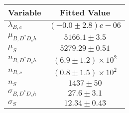 \begin{tabular}[t]{lc}
\hline
Variable &Fitted Value\\
\hline\hline
$\lambda_{B,c}$&$(-0.0\pm2.8)e-06$\\
\hline
$\mu_{B, D^* D_s h}$&$5166.1\pm3.5$\\
\hline
$\mu_S$&$5279.29\pm0.51$\\
\hline
$n_{B, D^* D_s h}$&$(6.9\pm1.2)\times 10^2$\\
\hline
$n_{B,c}$&$(0.8\pm1.5)\times 10^2$\\
\hline
$n_S$&$1437\pm50$\\
\hline
$\sigma_{B, D^* D_s h}$&$27.6\pm3.1$\\
\hline
$\sigma_S$&$12.34\pm0.43$\\
\hline
\end{tabular}